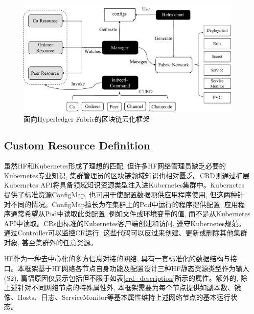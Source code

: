 \begin{figure}[h] %
    \centering %
    \includegraphics[width=1.0\textwidth]{FIGs/chapter4/framework.pdf} %
    \caption{面向Hyperledger Fabric的区块链云化框架} %
    \label{framework} %
\end{figure}%

\subsection{Custom Resource Definition}\label{section: Custom_Resource_Definition}

虽然HF和Kubernetes形成了理想的匹配, 但许多HF网络管理员缺乏必要的Kubernetes专业知识, 集群管理员的区块链领域知识也相对匮乏。CRD则通过扩展Kubernetes API将具备领域知识资源类型注入进Kubernetes集群中。Kubernetes提供了标准资源ConfigMap, 也可用于使配置数据项供应用程序使用, 但这两种针对不同的情况。ConfigMap擅长为在集群上的Pod中运行的程序提供配置, 应用程序通常希望从Pod中读取此类配置, 例如文件或环境变量的值, 而不是从Kubernetes API中读取。CRs由标准的Kubernetes客户端创建和访问, 遵守Kubernetes规范。通过Controller可以监控CR运行, 这些代码可以反过来创建、更新或删除其他集群对象, 甚至集群外的任意资源。

HF作为一种去中心化的多方信息对接的网络, 具有一套标准化的数据结构与接口。本框架基于HF网络各节点自身功能及配置\footnotemark[1]\footnotemark[2]\footnotemark[3]设计三种HF静态资源类型作为输入(S2), 篇幅原因仅展示包括但不限于如表\ref{crd_description}所示的属性。额外的, 除上述针对不同网络节点的特殊属性外, 本框架需要为每个节点提供如副本数、镜像、Hosts、日志、ServiceMonitor等基本属性维持上述网络节点的基本运行状态。

